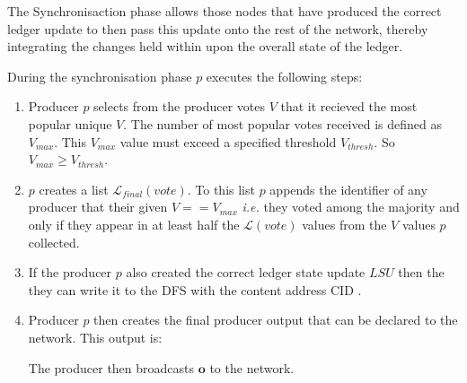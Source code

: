 The Synchronisaction phase allows those nodes that have produced the correct ledger update to then pass this update onto the rest of the network, thereby integrating the changes held within upon the overall state of the ledger. 

During the synchronisation phase $p$ executes the following steps:

\begin{enumerate}

\item Producer $p$ selects from the producer votes $V$ that it recieved the most popular unique $V$. The number of most popular votes received is defined as $V_{max}$. This $V_{max}$ value must exceed a specified threshold $V_{thresh}$. So $V_{max} \geq V_{thresh}$. %

\item $p$ creates a list $\mathcal{L}_{final}(vote)$. To this list $p$ appends the identifier of any producer that their given $V == V_{max}$ \textit{i.e.} they voted among the majority and only if they appear in at least half the $\mathcal{L}(vote)$ values from the $V$ values $p$ collected. 

\item If the producer $p$ also created the correct ledger state update $LSU$ then the they can write it to the DFS with the content address CID \cite{ADD LINK TO CID OBJ}. 

\item Producer $p$ then creates the final producer output that can be declared to the network. This output is:
\begin{center}
\label{eq:Hj}
\end{center}


The producer then broadcasts $\mathbf{o}$ to the network.
\end{enumerate}

